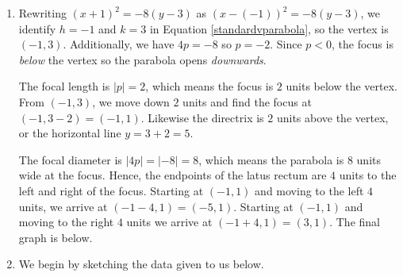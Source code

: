 \documentclass{ximera}
\begin{document}
\begin{example}
\begin{enumerate}
\end{enumerate}

\begin{explanation}

\begin{enumerate}

\item  Rewriting $(x+1)^2 =  -8(y-3)$ as $(x-(-1))^2 =  -8(y-3)$,  we identify $h = -1$ and  $k = 3$ in  Equation \ref{standardvparabola},  so the vertex is $(-1,3)$.  Additionally, we have $4p = -8$ so $p = -2$.  Since $p < 0$, the focus is  \textit{below} the vertex so the parabola opens \textit{downwards}.  


 

The focal length is $|p| = 2$, which means the focus is $2$ units below the vertex.  From $(-1,3)$, we move down $2$ units and find the focus at $(-1,3-2) = (-1,1)$.  Likewise the directrix is $2$ units above the vertex, or the horizontal line $y=3+2 = 5$.  



 

The focal diameter is $|4p| = |-8| = 8$, which means the parabola is $8$ units wide at the focus.  Hence, the endpoints of the latus rectum are $4$ units to the left and right of the focus.  Starting at $(-1,1)$ and moving to the left $4$ units, we arrive at $(-1-4,1) = (-5,1)$.  Starting at $(-1,1)$ and moving to the right $4$ units we arrive at $(-1+4,1) = (3,1)$.  The final graph is below.

\begin{center}
\end{center}


\item We begin by sketching the data given to us below.


\begin{image}
\end{image}
\end{enumerate}
\end{explanation}
\end{example}
\end{document}
